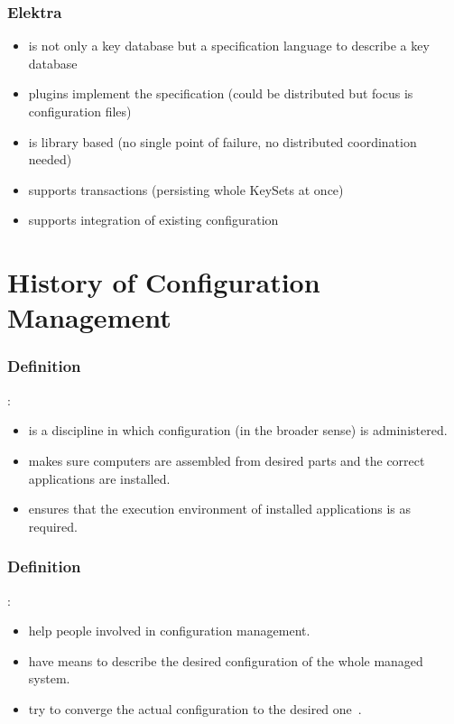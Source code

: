 \begin{frame}
	\frametitle{Elektra}

	\begin{itemize}
	\item is not only a key database but a specification language to describe a key database
	\item plugins implement the specification (could be distributed but focus is configuration files)
	\item is library based (no single point of failure, no distributed coordination needed)
	\item supports transactions (persisting whole KeySets at once)
	\item supports integration of existing configuration
	\end{itemize}
\end{frame}



\section{History of Configuration Management}

\begin{frame}
	\frametitle{Definition}

	:

	\begin{itemize}
	\item is a discipline in which configuration (in the broader sense) is administered.
	\item makes sure computers are assembled from desired parts and the correct applications are installed.
	\item ensures that the execution environment of installed applications is as required.%
	\end{itemize}
\end{frame}


\begin{frame}
	\frametitle{Definition}

	:

	\pause

	\begin{itemize}
	\item help people involved in configuration management.
	\item have means to describe the desired configuration of the whole managed system.
	\item try to converge the actual configuration to the desired one~\cite{burgess1995cfengine}.
	\end{itemize}
\end{frame}


